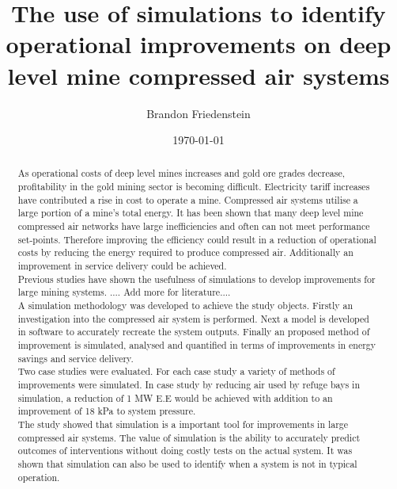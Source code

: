 \documentclass[11pt, english, oneside, singlespacing, open=any]{report}
\begin{document}
	
\begin{titlepage}
	\title{The use of simulations to identify
		operational improvements on deep level mine compressed
		air systems}
	\date{\today}
	\author{Brandon Friedenstein}
	\maketitle
\end{titlepage}

\begin{abstract}
	\thispagestyle{plain}
	\setcounter{page}{2}
	
	 As operational costs of deep level mines increases and gold ore grades decrease, profitability in the gold mining sector is becoming difficult. Electricity tariff increases have contributed a rise in cost to operate a mine.  Compressed air systems utilise a large portion of a mine's total energy. It has been shown that many deep level mine compressed air networks have large inefficiencies and often can not meet performance set-points. Therefore improving the efficiency could result in a reduction of operational costs by reducing the energy required to produce compressed air. Additionally an improvement in service delivery could be achieved. \\
	Previous studies have shown the usefulness of simulations to develop improvements for large mining systems.
	.... Add more for literature.... \\
	A simulation methodology was developed to achieve the study objects. Firstly an investigation into the compressed air system is performed. Next a model is developed in software to accurately recreate the system outputs. Finally an proposed method of improvement is simulated, analysed and quantified in terms of improvements in energy savings and service delivery.\\
	 Two case studies were evaluated. For each case study a variety of methods of improvements were simulated. In case study by reducing air used by refuge bays in simulation, a reduction of 1 MW E.E would be achieved with addition to an improvement of 18 kPa to system pressure.\\
	 The study showed that simulation is a important tool for improvements in large compressed air systems. The value of simulation is the ability to accurately predict outcomes of interventions without doing costly tests on the actual system. It was shown that simulation can also be used to identify when a system is not in typical operation.
	
\end{abstract}
\end{document}
